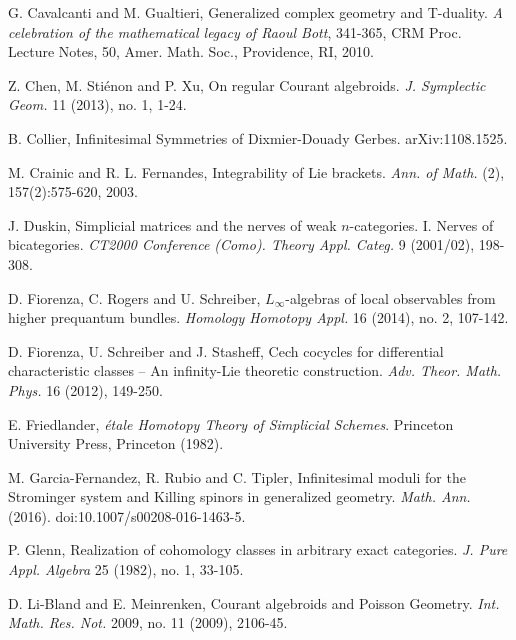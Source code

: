 \documentclass[letterpaper,10pt, oneside]{article} %
\begin{document}
\begin{thebibliography}{}
G. Cavalcanti and M. Gualtieri,   Generalized complex geometry and T-duality. \emph{A celebration of the mathematical legacy of Raoul Bott}, 341-365, CRM Proc. Lecture Notes, 50, Amer. Math. Soc., Providence, RI, 2010.

Z. Chen,   M. Sti\'enon and P. Xu,  On regular Courant algebroids. {\it J. Symplectic Geom.} 11 (2013), no. 1, 1-24.


B. Collier, Infinitesimal Symmetries of Dixmier-Douady Gerbes.
arXiv:1108.1525.


M. Crainic and R. L. Fernandes, Integrability of Lie brackets. \emph{Ann. of Math.} (2), 157(2):575-620,
2003.


J. Duskin,  Simplicial matrices and the nerves of weak $n$-categories. I. Nerves of bicategories. \emph{ CT2000 Conference (Como). Theory Appl. Categ.} 9 (2001/02), 198-308.

D. Fiorenza, C. Rogers  and U. Schreiber,   $L_\infty$-algebras of local observables from higher prequantum bundles. \emph{Homology Homotopy Appl. } 16 (2014), no. 2, 107-142.


D. Fiorenza, U. Schreiber and J. Stasheff, Cech cocycles for differential characteristic classes -- An infinity-Lie theoretic construction. \emph{Adv. Theor. Math. Phys.} 16 (2012), 149-250.



E. Friedlander, \emph{\'etale Homotopy Theory of Simplicial Schemes}. Princeton University Press, Princeton (1982).


M. Garcia-Fernandez, R. Rubio and C. Tipler,  Infinitesimal moduli for the Strominger system and Killing spinors in generalized geometry. \emph{Math. Ann.} (2016). doi:10.1007/s00208-016-1463-5.

 P. Glenn,   Realization of cohomology classes in arbitrary exact categories. \emph{J. Pure Appl. Algebra} 25 (1982), no. 1, 33-105.



 D. Li-Bland and E. Meinrenken, Courant algebroids and Poisson Geometry. \emph{Int. Math. Res. Not.} 2009, no. 11 (2009), 2106-45.


\end{thebibliography}
\end{document}
